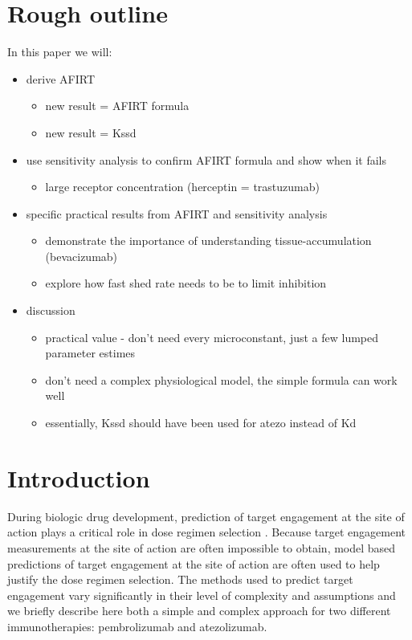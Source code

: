 \section{Rough outline}

In this paper we will:
\begin{itemize}
\item derive AFIRT
	\begin{itemize}
		\item new result = AFIRT formula
		\item new result = Kssd
	\end{itemize}
\item use sensitivity analysis to confirm AFIRT formula and show when it fails
	\begin{itemize}
		\item large receptor concentration (herceptin = trastuzumab)
	\end{itemize}
\item specific practical results from AFIRT and sensitivity analysis
	\begin{itemize}
		\item demonstrate the importance of understanding tissue-accumulation (bevacizumab)
		\item explore how fast shed rate needs to be to limit inhibition
	\end{itemize}
\item discussion
	\begin{itemize}
		\item practical value - don't need every microconstant, just a few lumped parameter estimes
		\item don't need a complex physiological model, the simple formula can work well
		\item essentially, Kssd should have been used for atezo instead of Kd
	\end{itemize}
\end{itemize}


\section{Introduction}
During biologic drug development, prediction of target engagement at the site of action plays a critical role in dose regimen selection \cite{wang16}.  Because target engagement measurements at the site of action are often impossible to obtain, model based predictions of target engagement at the site of action are often used to help justify the dose regimen selection.  The methods used to predict target engagement vary significantly in their level of complexity and assumptions and we briefly describe here both a simple and complex approach for two different immunotherapies: pembrolizumab and atezolizumab.

